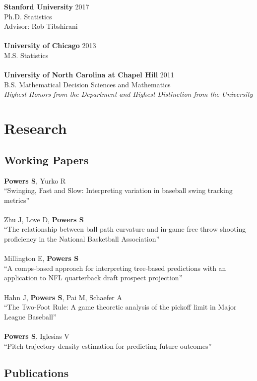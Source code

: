\documentclass{article}
\begin{document}
{\bf Stanford University} \hfill 2017\\
Ph.D. Statistics\\
Advisor: Rob Tibshirani\\
~\\
{\bf University of Chicago} \hfill 2013\\
M.S. Statistics\\
~\\
{\bf University of North Carolina at Chapel Hill} \hfill 2011\\
B.S. Mathematical Decision Sciences and Mathematics\\
{\it Highest Honors from the Department and Highest Distinction from the University}


\section*{\sc Research}

\subsection*{\sc Working Papers}

{\bf Powers S}, Yurko R\\
``Swinging, Fast and Slow: Interpreting variation in baseball swing tracking metrics''\\
~\\
Zhu J, Love D, {\bf Powers S}\\
``The relationship between ball path curvature and in-game free throw shooting proficiency in the National Basketball Association''\\
~\\
Millington E, {\bf Powers S}\\
``A comps-based approach for interpreting tree-based predictions with an application to NFL quarterback draft prospect projection''\\
~\\
Hahn J, {\bf Powers S}, Pai M, Schaefer A\\
``The Two-Foot Rule: A game theoretic analysis of the pickoff limit in Major League Baseball''\\
~\\
{\bf Powers S}, Iglesias V\\
``Pitch trajectory density estimation for predicting future outcomes''

\subsection*{\sc Publications}
\end{document}
